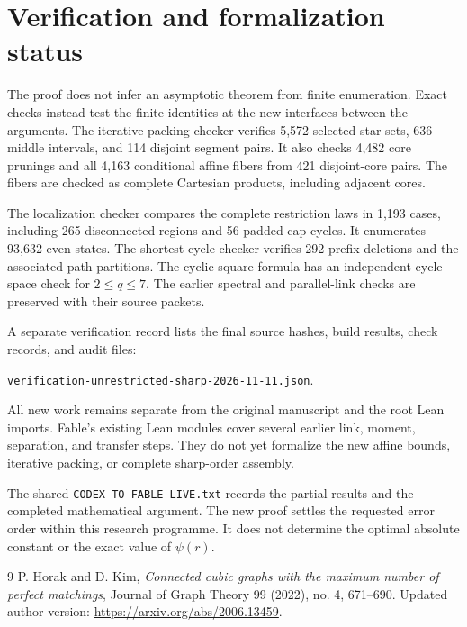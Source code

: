 \documentclass[11pt]{article}
\begin{document}
\section{Verification and formalization status}
The proof does not infer an asymptotic theorem from finite enumeration.
Exact checks instead test the finite identities at the new interfaces between the arguments.
The iterative-packing checker verifies 5,572 selected-star sets, 636 middle intervals, and 114 disjoint segment pairs.
It also checks 4,482 core prunings and all 4,163 conditional affine fibers from 421 disjoint-core pairs.
The fibers are checked as complete Cartesian products, including adjacent cores.

The localization checker compares the complete restriction laws in 1,193 cases, including 265 disconnected regions and 56 padded cap cycles.
It enumerates 93,632 even states.
The shortest-cycle checker verifies 292 prefix deletions and the associated path partitions.
The cyclic-square formula has an independent cycle-space check for $2\le q\le7$.
The earlier spectral and parallel-link checks are preserved with their source packets.

A separate verification record lists the final source hashes, build results, check records, and audit files:
\begin{center}
\nolinkurl{verification-unrestricted-sharp-2026-11-11.json}.
\end{center}
All new work remains separate from the original manuscript and the root Lean imports.
Fable's existing Lean modules cover several earlier link, moment, separation, and transfer steps.
They do not yet formalize the new affine bounds, iterative packing, or complete sharp-order assembly.

The shared \nolinkurl{CODEX-TO-FABLE-LIVE.txt} records the partial results and the completed mathematical argument.
The new proof settles the requested error order within this research programme.
It does not determine the optimal absolute constant or the exact value of $\psi(r)$.

\begin{thebibliography}{9}
P. Horak and D. Kim,
\emph{Connected cubic graphs with the maximum number of perfect matchings},
Journal of Graph Theory 99 (2022), no. 4, 671--690.
Updated author version: \url{https://arxiv.org/abs/2006.13459}.
\end{thebibliography}
\end{document}
